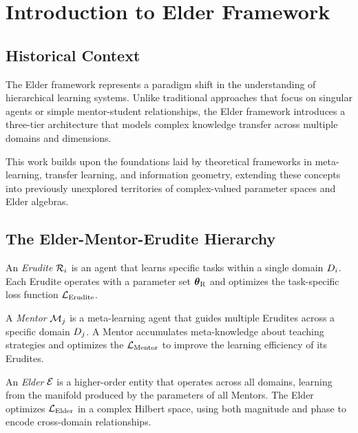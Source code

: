 \chapter{Introduction to Elder Framework}

\section{Historical Context}
The Elder framework represents a paradigm shift in the understanding of hierarchical learning systems. Unlike traditional approaches that focus on singular agents or simple mentor-student relationships, the Elder framework introduces a three-tier architecture that models complex knowledge transfer across multiple domains and dimensions.

This work builds upon the foundations laid by theoretical frameworks in meta-learning, transfer learning, and information geometry, extending these concepts into previously unexplored territories of complex-valued parameter spaces and Elder algebras.

\section{The Elder-Mentor-Erudite Hierarchy}

\begin{definition}[Erudite]
An \emph{Erudite} $\mathcal{R}_{i}$ is an agent that learns specific tasks within a single domain $D_{i}$. Each Erudite operates with a parameter set $\boldsymbol{\theta}_{\textrm{R}}{}$ and optimizes the task-specific loss function $\mathcal{L}_{\textrm{Erudite}}{}$.
\end{definition}

\begin{definition}[Mentor]
A \emph{Mentor} $\mathcal{M}_{j}$ is a meta-learning agent that guides multiple Erudites across a specific domain $D_{j}$. A Mentor accumulates meta-knowledge about teaching strategies and optimizes the $\mathcal{L}_{\textrm{Mentor}}{}$ to improve the learning efficiency of its Erudites.
\end{definition}

\begin{definition}[Elder]
An \emph{Elder} $\mathcal{E}_{}$ is a higher-order entity that operates across all domains, learning from the manifold produced by the parameters of all Mentors. The Elder optimizes $\mathcal{L}_{\textrm{Elder}}{}$ in a complex Hilbert space, using both magnitude and phase to encode cross-domain relationships.
\end{definition}

